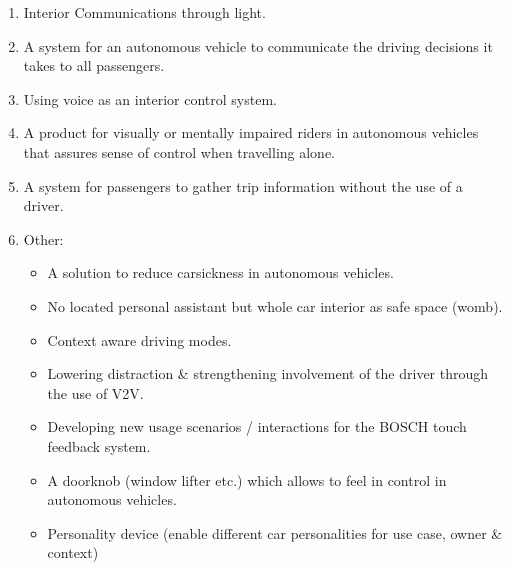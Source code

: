     \begin{enumerate}
    \item Interior Communications through light.
    \item A system for an autonomous vehicle to communicate the driving decisions it takes to all passengers.
    \item Using voice as an interior control system.
    \item A product for visually or mentally impaired riders in autonomous vehicles that assures sense of control when travelling alone.
    \item A system for passengers to gather trip information without the use of a driver.
    \item Other:
    \begin{itemize}
    \item A solution to reduce carsickness in autonomous vehicles.
    \item No located personal assistant but whole car interior as safe space (womb).
    \item Context aware driving modes.
    \item Lowering distraction \& strengthening involvement of the driver through the use of V2V.
    \item Developing new usage scenarios / interactions for the BOSCH touch feedback system.
    \item A doorknob (window lifter etc.) which allows to feel in control in autonomous vehicles.
    \item Personality device (enable different car personalities for use case, owner \& context)
\end{itemize}
    \end{enumerate}


